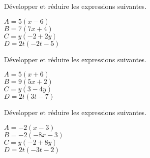 \documentclass[a4paper,11pt,fleqn]{article}		%
\begin{document}
\begin{multicols}{2}
Développer et réduire les expressions suivantes.

\begin{multicols}{2}
$A=  5 (x  -6)$\\
$B= 7 ( 7 x    +4)$\\
$C=y( -2  +2 y)$\\
$D= 2  t(  -2 t -5)$
\end{multicols}

%
%
%


Développer et réduire les expressions suivantes.

\begin{multicols}{2}
$A=  5 (x  +6)$\\
$B= 9 ( 5 x    +2)$\\
$C=y( 3  -4 y)$\\
$D= 2  t(  3 t -7)$
\end{multicols}

%
%
%


Développer et réduire les expressions suivantes.

\begin{multicols}{2}
$A=  -2 (x  -3)$\\
$B= -2 ( -8 x    -3)$\\
$C=y( -2  +8 y)$\\
$D= 2  t(  -3 t -2)$
\end{multicols}

%
%
%



\end{multicols}
\end{document}
